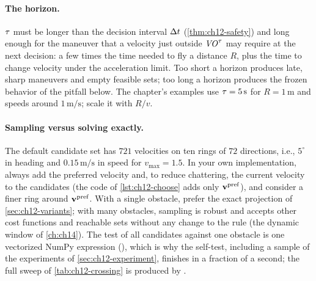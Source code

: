 \paragraph{The horizon.}
$\tau$ must be longer than the decision interval $\Delta t$ (\cref{thm:ch12-safety})
and long enough for the maneuver that a velocity just outside
$\mathit{VO}^{\tau}$ may require at the next decision: a few times the time needed to
fly a distance $R$, plus the time to change velocity under the acceleration
limit. Too short a horizon produces late, sharp maneuvers and empty feasible
sets; too long a horizon produces the frozen behavior of the pitfall below.
The chapter's examples use $\tau = 5\,\mathrm{s}$ for $R = 1\,\mathrm{m}$ and
speeds around $1\,\mathrm{m/s}$; scale it with $R/v$.

\paragraph{Sampling versus solving exactly.}
The default candidate set has $721$ velocities on ten rings of $72$
directions, i.e., $5^\circ$ in heading and $0.15\,\mathrm{m/s}$ in speed for
$v_{\max} = 1.5$. In your own implementation, always add the preferred
velocity and, to reduce chattering, the current velocity to the candidates
(the code of \cref{lst:ch12-choose} adds only $\mathbf{v}^{\mathrm{pref}}$), and consider a finer ring around
$\mathbf{v}^{\mathrm{pref}}$. With a single obstacle, prefer the exact projection of
\cref{sec:ch12-variants}; with many obstacles, sampling is robust and accepts
other cost functions and reachable sets without any change to the rule (the
dynamic window of \cref{ch:ch14}). The test of all
candidates against one obstacle is one vectorized NumPy expression
(), which is why the self-test, including a sample of the
experiments of \cref{sec:ch12-experiment}, finishes in a fraction of a second;
the full sweep of \cref{tab:ch12-crossing} is produced by
.


